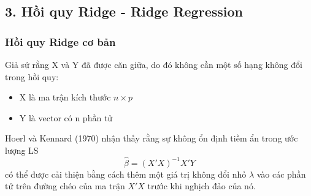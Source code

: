 \documentclass{article}
\begin{document}
	\subsection{3. Hồi quy Ridge - Ridge Regression}
	\subsubsection{Hồi quy Ridge cơ bản}
	Giả sử rằng X và Y đã được căn giữa, do đó không cần một số hạng không đổi trong hồi quy:
	\begin{itemize}
		\item X là ma trận kích thước $n \times p$
		\item Y là vector có n phần tử
	\end{itemize}
	Hoerl và Kennard (1970) nhận thấy rằng sự không ổn định tiềm ẩn trong ước lượng LS
	$$\hat{\beta} = (X'X)^{-1}X'Y$$
	có thể được cải thiện bằng cách thêm một giá trị không đổi nhỏ $\lambda$ vào các phần tử trên đường chéo của ma trận $X'X$ trước khi nghịch đảo của nó.
	
\end{document}
